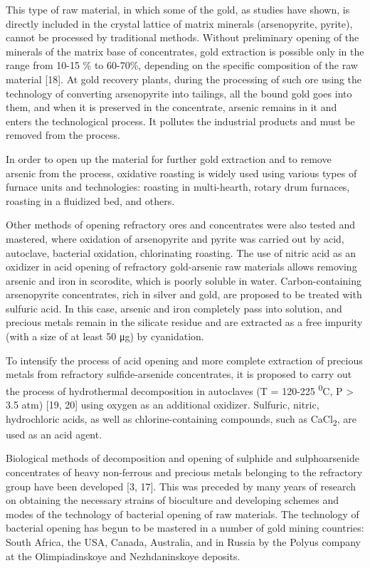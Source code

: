 \begin{multicols}{2}
This type of raw material, in which some of the gold, as studies have
shown, is directly included in the crystal lattice of matrix minerals
(arsenopyrite, pyrite), cannot be processed by traditional methods.
Without preliminary opening of the minerals of the matrix base of
concentrates, gold extraction is possible only in the range from 10-15
\% to 60-70\%, depending on the specific composition of the raw material
{[}18{]}. At gold recovery plants, during the processing of such ore
using the technology of converting arsenopyrite into tailings, all the
bound gold goes into them, and when it is preserved in the concentrate,
arsenic remains in it and enters the technological process. It pollutes
the industrial products and must be removed from the process.

In order to open up the material for further gold extraction and to
remove arsenic from the process, oxidative roasting is widely used using
various types of furnace units and technologies: roasting in
multi-hearth, rotary drum furnaces, roasting in a fluidized bed, and
others.

Other methods of opening refractory ores and concentrates were also
tested and mastered, where oxidation of arsenopyrite and pyrite was
carried out by acid, autoclave, bacterial oxidation, chlorinating
roasting. The use of nitric acid as an oxidizer in acid opening of
refractory gold-arsenic raw materials allows removing arsenic and iron
in scorodite, which is poorly soluble in water. Carbon-containing
arsenopyrite concentrates, rich in silver and gold, are proposed to be
treated with sulfuric acid. In this case, arsenic and iron completely
pass into solution, and precious metals remain in the silicate residue
and are extracted as a free impurity (with a size of at least 50 μg) by
cyanidation.

To intensify the process of acid opening and more complete extraction of
precious metals from refractory sulfide-arsenide concentrates, it is
proposed to carry out the process of hydrothermal decomposition in
autoclaves (T = 120-225 \textsuperscript{0}C, P \textgreater{} 3.5 atm)
{[}19, 20{]} using oxygen as an additional oxidizer. Sulfuric, nitric,
hydrochloric acids, as well as chlorine-containing compounds, such as
CaCl\textsubscript{2}, are used as an acid agent.

Biological methods of decomposition and opening of sulphide and
sulphoarsenide concentrates of heavy non-ferrous and precious metals
belonging to the refractory group have been developed {[}3, 17{]}. This
was preceded by many years of research on obtaining the necessary
strains of bioculture and developing schemes and modes of the technology
of bacterial opening of raw materials. The technology of bacterial
opening has begun to be mastered in a number of gold mining countries:
South Africa, the USA, Canada, Australia, and in Russia by the Polyus
company at the Olimpiadinskoye and Nezhdaninskoye deposits.


\end{multicols}
